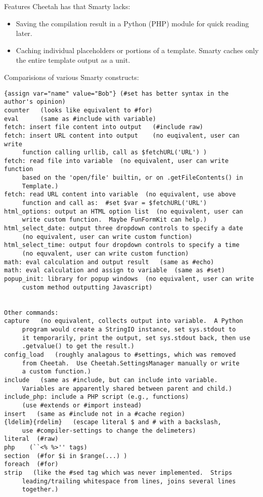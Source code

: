 Features Cheetah has that Smarty lacks:
\begin{itemize}
\item Saving the compilation result in a Python (PHP) module for quick
reading later.
\item Caching individual placeholders or portions of a template.  Smarty
caches only the entire template output as a unit.
\end{itemize}

Comparisions of various Smarty constructs:
\begin{verbatim}
{assign var="name" value="Bob"} (#set has better syntax in the author's opinion)
counter   (looks like equivalent to #for)
eval      (same as #include with variable)
fetch: insert file content into output   (#include raw)
fetch: insert URL content into output    (no euqivalent, user can write
     function calling urllib, call as $fetchURL('URL') )
fetch: read file into variable  (no equivalent, user can write function
     based on the 'open/file' builtin, or on .getFileContents() in
     Template.)
fetch: read URL content into variable  (no equivalent, use above
     function and call as:  #set $var = $fetchURL('URL')
html_options: output an HTML option list  (no equivalent, user can
     write custom function.  Maybe FunFormKit can help.)
html_select_date: output three dropdown controls to specify a date
     (no equivalent, user can write custom function)
html_select_time: output four dropdown controls to specify a time
     (no equvalent, user can write custom function)
math: eval calculation and output result   (same as #echo)
math: eval calculation and assign to variable  (same as #set)
popup_init: library for popup windows  (no equivalent, user can write
     custom method outputting Javascript)


Other commands:
capture   (no equivalent, collects output into variable.  A Python
     program would create a StringIO instance, set sys.stdout to
     it temporarily, print the output, set sys.stdout back, then use
     .getvalue() to get the result.)
config_load   (roughly analagous to #settings, which was removed
     from Cheetah.  Use Cheetah.SettingsManager manually or write
     a custom function.)
include   (same as #include, but can include into variable.
     Variables are apparently shared between parent and child.)
include_php: include a PHP script (e.g., functions)
     (use #extends or #import instead)
insert   (same as #include not in a #cache region)
{ldelim}{rdelim}   (escape literal $ and # with a backslash,
     use #compiler-settings to change the delimeters)
literal  (#raw)
php    (``<% %>'' tags)
section  (#for $i in $range(...) )
foreach  (#for)
strip   (like the #sed tag which was never implemented.  Strips
     leading/trailing whitespace from lines, joins several lines
     together.)



\end{verbatim}
